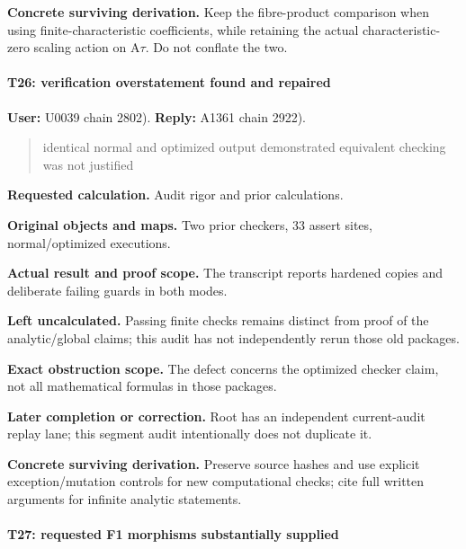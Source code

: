 \textbf{Concrete surviving derivation.} Keep the fibre-product
comparison when using finite-characteristic coefficients, while
retaining the actual characteristic-zero scaling action on
A\allowbreak{}\ensuremath{τ}\allowbreak{}. Do not conflate the two.

\paragraph{T26: verification overstatement found and
repaired}\label{t26-verification-overstatement-found-and-repaired}

\textbf{User:} U0039
\protect{} chain 2802).
\textbf{Reply:} A1361
\protect{} chain 2922).

\begin{quote}
identical normal and optimized output demonstrated equivalent checking
was not justified
\end{quote}

\textbf{Requested calculation.} Audit rigor and prior calculations.

\textbf{Original objects and maps.} Two prior checkers, 33 assert sites,
normal/optimized executions.

\textbf{Actual result and proof scope.} The transcript reports hardened
copies and deliberate failing guards in both modes.

\textbf{Left uncalculated.} Passing finite checks remains distinct from
proof of the analytic/global claims; this audit has not independently
rerun those old packages.

\textbf{Exact obstruction scope.} The defect concerns the optimized
checker claim, not all mathematical formulas in those packages.

\textbf{Later completion or correction.} Root has an independent
current-audit replay lane; this segment audit intentionally does not
duplicate it.

\textbf{Concrete surviving derivation.} Preserve source hashes and use
explicit exception/mutation controls for new computational checks; cite
full written arguments for infinite analytic statements.

\paragraph{T27: requested F1 morphisms substantially
supplied}\label{t27-requested-f1-morphisms-substantially-supplied}

